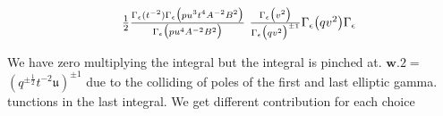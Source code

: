 \documentclass{article}
\begin{document}
\begin{equation}
\begin{array} { r l } & { \frac { 1 } { 2 } \frac { \Gamma _ { \epsilon } ( t ^ { - 2 } ) \Gamma _ { \epsilon } \big ( p u ^ { 3 } t ^ { 4 } A ^ { - 2 } B ^ { 2 } \big ) } { \Gamma _ { \epsilon } \big ( p u ^ { 4 } A ^ { - 2 } B ^ { 2 } \big ) } ~ \frac { \Gamma _ { \epsilon } \big ( v ^ { 2 } \big ) } { \Gamma _ { \epsilon } \big ( q v ^ { 2 } \big ) ^ { \pm 1 } } \Gamma _ { \epsilon } \big ( q v ^ { 2 } \big ) \Gamma _ { \epsilon }}\end{array}
\end{equation}


We have zero multiplying the integral but the integral is pinched at. $\mathbf { w } . { 2 } =$
$\left ( q ^ { \pm \frac { 1 } { 2 } } t ^ { - 2 } \mathfrak { u } \right ) ^ { \pm 1 }$ due to the colliding of poles of the first and last elliptic gamma.
tunctions in the last integral. We get different contribution for each choice
\end{document}

